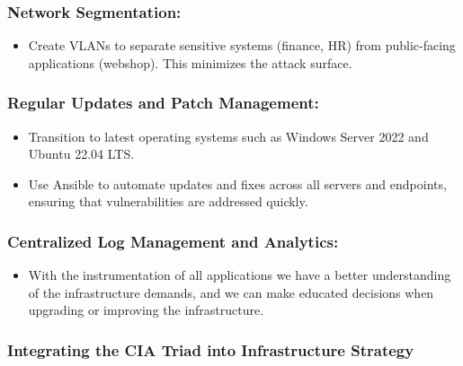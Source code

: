 \documentclass{llncs}
\begin{document}
\subsubsection{Network Segmentation:}

\begin{itemize}
  \item Create VLANs to separate sensitive systems (finance, HR) from public-facing applications (webshop). This minimizes the attack surface.
\end{itemize}


\subsubsection{Regular Updates and Patch Management:}

\begin{itemize}
  \item Transition to latest operating systems such as Windows Server 2022 and Ubuntu 22.04 LTS.
  \item Use Ansible to automate updates and fixes across all servers and endpoints, ensuring that vulnerabilities are addressed quickly.
\end{itemize}

\subsubsection{Centralized Log Management and Analytics:}

\begin{itemize}
  \item With the instrumentation of all applications we have a better understanding of the infrastructure demands, and we can make educated decisions when upgrading or improving the infrastructure.
\end{itemize}


\subsubsection{Integrating the CIA Triad into Infrastructure Strategy}
\phantom{.}
\end{document}
